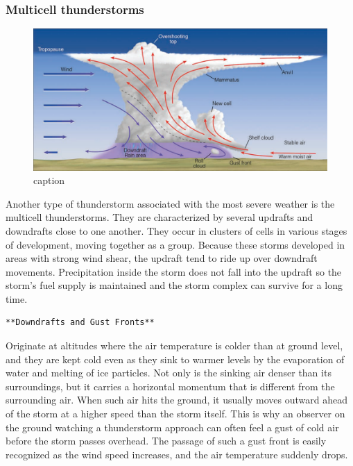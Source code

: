 \documentclass[12pt,oneside]{book}
\begin{document}
\subsubsection{Multicell thunderstorms}\label{multicell-thunderstorms}

\begin{figure}

{\centering \includegraphics[width=0.8\linewidth]{figures/FigureE3} 

}

\caption{caption}\label{fig:Multicellthunderstorms}
\end{figure}

Another type of thunderstorm associated with the most severe weather is
the multicell thunderstorms. They are characterized by several updrafts
and downdrafts close to one another. They occur in clusters of cells in
various stages of development, moving together as a group. Because these
storms developed in areas with strong wind shear, the updraft tend to
ride up over downdraft movements. Precipitation inside the storm does
not fall into the updraft so the storm's fuel supply is maintained and
the storm complex can survive for a long time.

\begin{verbatim}
**Downdrafts and Gust Fronts**
\end{verbatim}

Originate at altitudes where the air temperature is colder than at
ground level, and they are kept cold even as they sink to warmer levels
by the evaporation of water and melting of ice particles. Not only is
the sinking air denser than its surroundings, but it carries a
horizontal momentum that is different from the surrounding air. When
such air hits the ground, it usually moves outward ahead of the storm at
a higher speed than the storm itself. This is why an observer on the
ground watching a thunderstorm approach can often feel a gust of cold
air before the storm passes overhead. The passage of such a gust front
is easily recognized as the wind speed increases, and the air
temperature suddenly drops.
\end{document}
